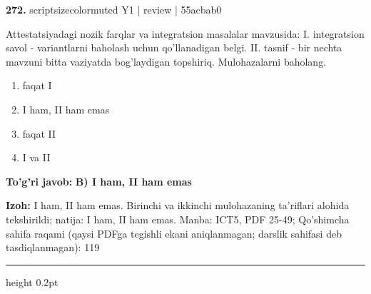 \documentclass[10pt,a4paper]{article}
\begin{document}
{\bfseries\sffamily\color{ink} 272.} {scriptsizecolor{muted} Y1 | review | 55acbab0}
\par
Attestatsiyadagi nozik farqlar va integratsion masalalar mavzusida: I. integratsion savol - variantlarni baholash uchun qo'llanadigan belgi. II. tasnif - bir nechta mavzuni bitta vaziyatda bog'laydigan topshiriq. Mulohazalarni baholang.
\begin{enumerate}[label=\Alph*),leftmargin=9mm]
\item faqat I
\item I ham, II ham emas
\item faqat II
\item I va II
\end{enumerate}
\begin{tcolorbox}[enhanced,breakable,colback=teal!4,colframe=teal!60!black,boxrule=0.45pt,arc=1.2mm,left=2.7mm,right=2.7mm,top=1.8mm,bottom=1.8mm,before skip=2mm,after skip=2mm]
{\bfseries\sffamily\color{teal}To'g'ri javob:} \textbf{B) I ham, II ham emas}
\par\smallskip
{\bfseries Izoh:} I ham, II ham emas. Birinchi va ikkinchi mulohazaning ta'riflari alohida tekshirildi; natija: I ham, II ham emas. Manba: ICT5, PDF 25-49; Qo'shimcha sahifa raqami (qaysi PDFga tegishli ekani aniqlanmagan; darslik sahifasi deb tasdiqlanmagan): 119
\end{tcolorbox}
\vspace{2mm}\hrule height 0.2pt\vspace{3mm}
\end{document}
